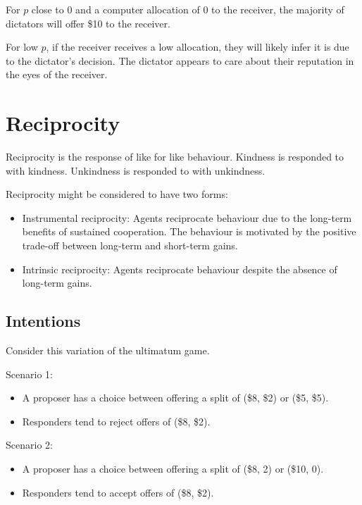 \documentclass[
  letterpaper,
  DIV=11,
  numbers=noendperiod]{scrreprt}
\begin{document}
For \(p\) close to 0 and a computer allocation of 0 to the receiver, the
majority of dictators will offer \$10 to the receiver.

For low \(p\), if the receiver receives a low allocation, they will
likely infer it is due to the dictator's decision. The dictator appears
to care about their reputation in the eyes of the receiver.

\hypertarget{reciprocity}{%
\chapter{Reciprocity}\label{reciprocity}}

Reciprocity is the response of like for like behaviour. Kindness is
responded to with kindness. Unkindness is responded to with unkindness.

Reciprocity might be considered to have two forms:

\begin{itemize}
\item
  Instrumental reciprocity: Agents reciprocate behaviour due to the
  long-term benefits of sustained cooperation. The behaviour is
  motivated by the positive trade-off between long-term and short-term
  gains.
\item
  Intrinsic reciprocity: Agents reciprocate behaviour despite the
  absence of long-term gains.
\end{itemize}

\hypertarget{intentions}{%
\section{Intentions}\label{intentions}}

Consider this variation of the ultimatum game.

Scenario 1:

\begin{itemize}
\item
  A proposer has a choice between offering a split of (\$8, \$2) or
  (\$5, \$5).
\item
  Responders tend to reject offers of (\$8, \$2).
\end{itemize}

Scenario 2:

\begin{itemize}
\item
  A proposer has a choice between offering a split of (\$8, 2) or (\$10,
  0).
\item
  Responders tend to accept offers of (\$8, \$2).
\end{itemize}
\end{document}
